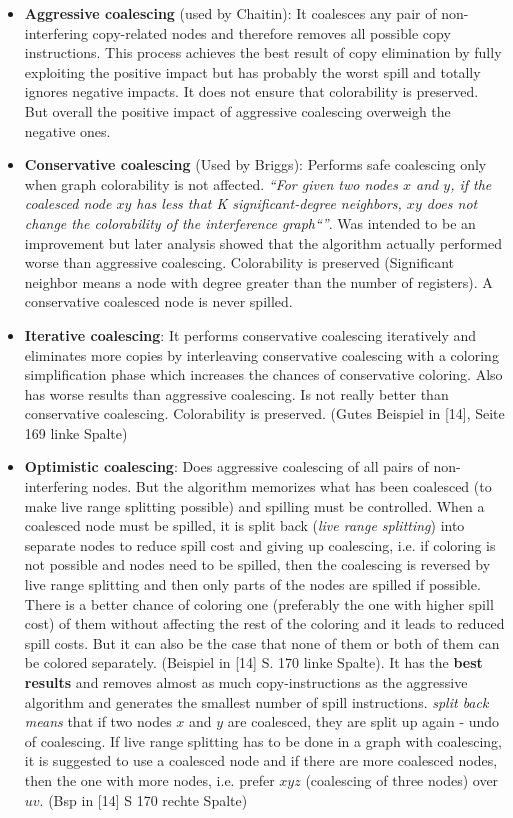 \documentclass[a4paper,10pt]{article}
\begin{document}
\begin{itemize}
	\item \textbf{Aggressive coalescing} (used by Chaitin): It coalesces any pair of non-interfering copy-related nodes and therefore removes all possible copy instructions. This process achieves the best result of copy elimination by fully exploiting the positive impact but has probably the worst spill and totally ignores negative impacts. It does not ensure that colorability is preserved. But overall the positive impact of aggressive coalescing overweigh the negative ones.
	\item \textbf{Conservative coalescing} (Used by Briggs): Performs safe coalescing only when graph colorability is not affected. \textit{``For given two nodes $x$ and $y$, if the coalesced node $xy$ has less that K significant-degree neighbors, $xy$ does not change the colorability of the interference graph``''}. Was intended to be an improvement but later analysis showed that the algorithm actually performed worse than aggressive coalescing. Colorability is preserved (Significant neighbor means a node with degree greater than the number of registers). A conservative coalesced node is never spilled.
	\item \textbf{Iterative coalescing}: It performs conservative coalescing iteratively and eliminates more copies by interleaving conservative coalescing with a coloring simplification phase which increases the chances of conservative coloring. Also has worse results than aggressive coalescing. Is not really better than conservative coalescing. Colorability is preserved. (Gutes Beispiel in [14], Seite 169 linke Spalte)
	\item \textbf{Optimistic coalescing}: Does aggressive coalescing of all pairs of non-interfering nodes. But the algorithm memorizes what has been coalesced (to make live range splitting possible) and spilling must be controlled. When a coalesced node must be spilled, it is split back (\textit{live range splitting}) into separate nodes to reduce spill cost and giving up coalescing, i.e. if coloring is not possible and nodes need to be spilled, then the coalescing is reversed by live range splitting and then only parts of the nodes are spilled if possible. There is a better chance of coloring one (preferably the one with higher spill cost) of them without affecting the rest of the coloring and it leads to reduced spill costs. But it can also be the case that none of them or both of them can be colored separately. (Beispiel in [14] S. 170 linke Spalte). It has the \textbf{best results} and removes almost as much copy-instructions as the aggressive algorithm and generates the smallest number of spill instructions. \textit{split back means} that if two nodes $x$ and $y$ are coalesced, they are split up again - undo of coalescing. If live range splitting has to be done in a graph with coalescing, it is suggested to use a coalesced node and if there are more coalesced nodes, then the one with more nodes, i.e. prefer $xyz$ (coalescing of three nodes) over $uv$. (Bsp in [14] S 170 rechte Spalte)
\end{itemize}
\end{document}
